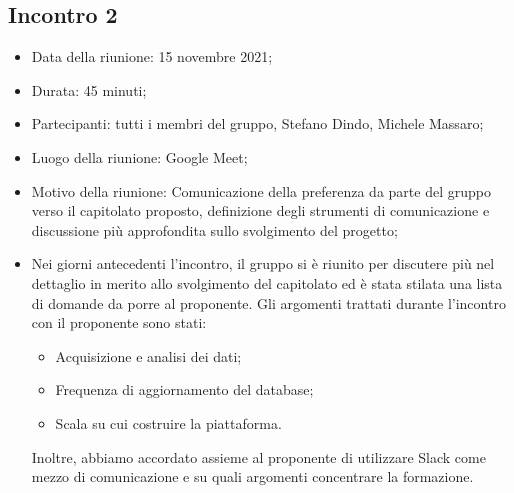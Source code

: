 \subsection{Incontro 2}
\begin{itemize}
\item Data della riunione: 15 novembre 2021;
\item Durata: 45 minuti;
\item Partecipanti: tutti i membri del gruppo,  Stefano Dindo,  Michele Massaro;
\item Luogo della riunione: Google Meet;
\item Motivo della riunione: Comunicazione della preferenza da parte del gruppo verso il capitolato proposto, definizione degli strumenti di comunicazione e discussione più approfondita sullo svolgimento del progetto;
\item Nei giorni antecedenti l’incontro, il gruppo si è riunito per discutere più nel dettaglio in merito allo svolgimento del capitolato ed è stata stilata una lista di domande da porre al proponente.  Gli argomenti trattati durante l’incontro con il proponente sono stati:
	\begin{itemize}
		\item Acquisizione e analisi dei dati;
		\item Frequenza di aggiornamento del database;
		\item Scala su cui costruire la piattaforma.
	\end{itemize}
	Inoltre, abbiamo accordato assieme al proponente di utilizzare Slack come mezzo di comunicazione e su quali argomenti concentrare la formazione.

\end{itemize} 


